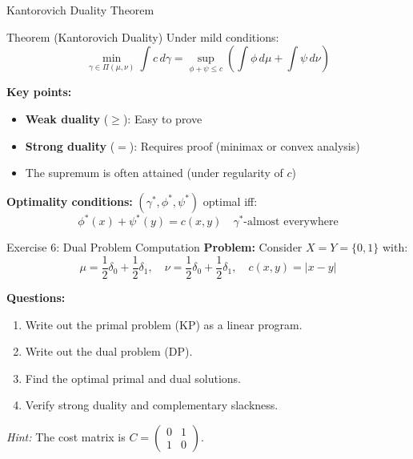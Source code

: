 \documentclass[aspectratio=169]{beamer}
\begin{document}
\begin{frame}{Kantorovich Duality Theorem}
\begin{block}{Theorem (Kantorovich Duality)}
Under mild conditions:
\[
\boxed{\min_{\gamma \in \Pi(\mu,\nu)} \int c \, d\gamma = \sup_{\phi + \psi \leq c} \left( \int \phi \, d\mu + \int \psi \, d\nu \right)}
\]
\end{block}

\vspace{0.3cm}
\textbf{Key points:}
\begin{itemize}
    \item \textbf{Weak duality} ($\geq$): Easy to prove
    \item \textbf{Strong duality} ($=$): Requires proof (minimax or convex analysis)
    \item The supremum is often attained (under regularity of $c$)
\end{itemize}

\vspace{0.3cm}
\textbf{Optimality conditions:} $(\gamma^*, \phi^*, \psi^*)$ optimal iff:
\[
\phi^*(x) + \psi^*(y) = c(x,y) \quad \gamma^*\text{-almost everywhere}
\]
\end{frame}

\begin{frame}{Exercise 6: Dual Problem Computation}
\textbf{Problem:} Consider $X = Y = \{0, 1\}$ with:
\[
\mu = \frac{1}{2}\delta_0 + \frac{1}{2}\delta_1, \quad \nu = \frac{1}{2}\delta_0 + \frac{1}{2}\delta_1, \quad c(x,y) = |x-y|
\]

\vspace{0.3cm}
\textbf{Questions:}
\begin{enumerate}
    \item[(a)] Write out the primal problem (KP) as a linear program.
    \item[(b)] Write out the dual problem (DP).
    \item[(c)] Find the optimal primal and dual solutions.
    \item[(d)] Verify strong duality and complementary slackness.
\end{enumerate}

\vspace{0.3cm}
\textit{Hint:} The cost matrix is $C = \begin{pmatrix} 0 & 1 \\ 1 & 0 \end{pmatrix}$.
\end{frame}
\end{document}
